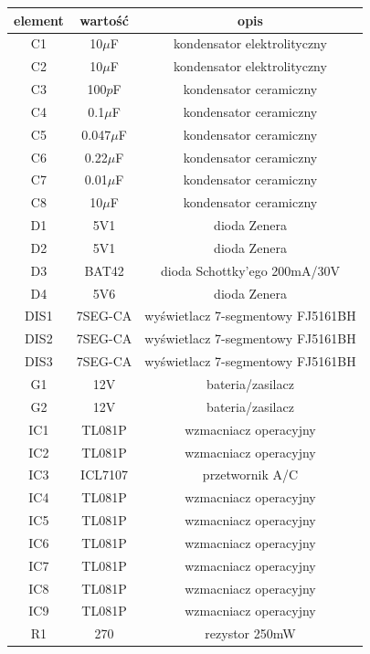 \documentclass[12pt]{article}
\begin{document}
\begin{minipage}[c]{0.45\linewidth}
\tiny
\centering
\begin{tabular}{|c|c|c|}
\hline
element & wartość & opis \\
\hline
C1 & 10$\mu$F & kondensator elektrolityczny \\
\hline
C2 & 10$\mu$F & kondensator elektrolityczny \\
\hline
C3 & 100$p$F & kondensator ceramiczny \\
\hline
C4 & 0.1$\mu$F & kondensator ceramiczny \\
\hline
C5 & 0.047$\mu$F & kondensator ceramiczny \\
\hline
C6 & 0.22$\mu$F & kondensator ceramiczny \\
\hline
C7 & 0.01$\mu$F & kondensator ceramiczny \\
\hline
C8 & 10$\mu$F & kondensator ceramiczny \\
\hline
D1 & 5V1 & dioda Zenera \\
\hline
D2 & 5V1 & dioda Zenera \\
\hline
D3 & BAT42 & dioda Schottky'ego 200mA/30V \\
\hline
D4 & 5V6 & dioda Zenera \\
\hline
DIS1 & 7SEG-CA & wyświetlacz 7-segmentowy FJ5161BH \\
\hline
DIS2 & 7SEG-CA & wyświetlacz 7-segmentowy FJ5161BH \\
\hline
DIS3 & 7SEG-CA & wyświetlacz 7-segmentowy FJ5161BH \\
\hline 
G1 & 12V & bateria/zasilacz \\
\hline
G2 & 12V & bateria/zasilacz \\
\hline 
IC1 & TL081P & wzmacniacz operacyjny \\
\hline 
IC2 & TL081P & wzmacniacz operacyjny \\
\hline 
IC3 & ICL7107 & przetwornik A/C \\
\hline 
IC4 & TL081P & wzmacniacz operacyjny \\
\hline
IC5 & TL081P & wzmacniacz operacyjny \\
\hline 
IC6 & TL081P & wzmacniacz operacyjny \\
\hline 
IC7 & TL081P & wzmacniacz operacyjny \\
\hline 
IC8 & TL081P & wzmacniacz operacyjny \\
\hline 
IC9 & TL081P & wzmacniacz operacyjny \\
\hline
R1 & 270 & rezystor 250mW \\
\hline

\end{tabular}
\end{minipage}
\end{document}
